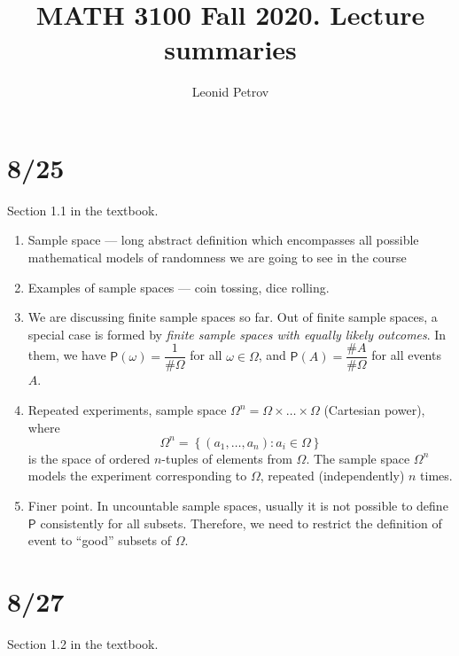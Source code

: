 \documentclass[letterpaper,11pt,oneside,reqno]{amsart}
\numberwithin{equation}{section}
\theoremstyle{definition}
\begin{document}
\title{MATH 3100 Fall 2020. Lecture summaries}


\author{Leonid Petrov}

\date{}

\maketitle

\section{8/25}

Section 1.1 in the textbook.

\begin{enumerate}
	\item Sample space --- long abstract definition which encompasses 
		all possible mathematical models of randomness we are going to see in the course
	\item Examples of sample spaces --- coin tossing, dice rolling. 
	\item We are discussing finite sample spaces so far.
		Out of finite sample spaces, a special case is formed by 
		\emph{finite sample spaces with equally likely outcomes}.
		In them, we have $\mathsf{P}(\omega)=\dfrac1{\#\Omega}$ for all
		$\omega\in \Omega$, 
		and $\mathsf{P}(A)=\dfrac{\#A}{\#\Omega}$ for all events $A$.
	\item Repeated experiments, sample space $\Omega^n=\Omega\times \ldots\times \Omega $
		(Cartesian power), where
		\begin{equation*}
			\Omega^n = \left\{ (a_1,\ldots,a_n )\colon a_i\in \Omega \right\}
		\end{equation*}
		is the space of ordered $n$-tuples of elements from $\Omega$. 
		The sample space $\Omega^n$ models the experiment corresponding to $\Omega$,
		repeated (independently) $n$ times.
	\item Finer point. In uncountable sample spaces, usually it is not possible to 
		define $\mathsf{P}$ consistently for all subsets. Therefore, 
		we need to restrict the definition of event to ``good'' subsets of $\Omega$.
\end{enumerate}

\section{8/27}

Section 1.2 in the textbook.
\end{document}
